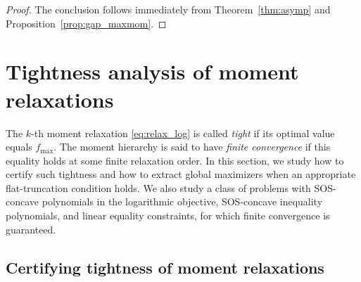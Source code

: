 \documentclass[pdflatex,sn-mathphys-num]{sn-jnl}%
\newcommand{\rd}[1]{{\color{red}#1}}
\theoremstyle{thmstyleone}%
\theoremstyle{thmstyletwo}%
\theoremstyle{thmstylethree}%
\begin{document}
\begin{proof}
The conclusion follows immediately from
Theorem~\ref{thm:asymp} and
Proposition~\ref{prop:gap_maxmom}.
\end{proof}




\section{Tightness analysis of moment relaxations}\label{sec:tight}

\rd{The $k$-th moment relaxation \eqref{eq:relax_log} is called
{\it tight} if its optimal value equals $f_{\max}$. The moment hierarchy
is said to have {\it finite convergence} if this equality holds at some
finite relaxation order.}
In this section, we study how to certify such tightness and 
\rd{how to extract global maximizers when an appropriate flat-truncation
condition holds.}
\rd{We also study a class of problems with SOS-concave polynomials in
the logarithmic objective, SOS-concave inequality polynomials, and
linear equality constraints, for which finite convergence is guaranteed.}


\subsection{Certifying tightness of moment relaxations}
\end{document}
